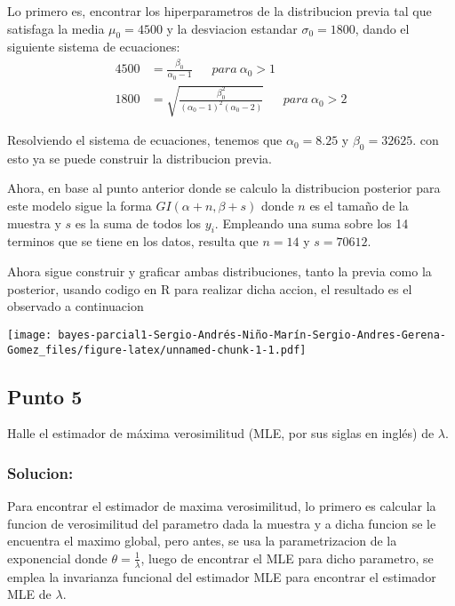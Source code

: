 \documentclass[
]{article}
\begin{document}
Lo primero es, encontrar los hiperparametros de la distribucion previa
tal que satisfaga la media \(\mu_0 = 4500\) y la desviacion estandar
\(\sigma_0 = 1800\), dando el siguiente sistema de ecuaciones: \[
\begin{split}
4500&=\frac{\beta_0}{\alpha_0-1}\ \ \ \ \ \ \ para \ \alpha_0 >1\\
1800&=\sqrt{\frac{\beta_0^2}{(\alpha_0-1)^2(\alpha_0-2)}} \ \ \ \ \ \ \ para \ \alpha_0>2
\end{split}
\]

Resolviendo el sistema de ecuaciones, tenemos que \(\alpha_0=8.25\) y
\(\beta_0=32625\). con esto ya se puede construir la distribucion
previa.

Ahora, en base al punto anterior donde se calculo la distribucion
posterior para este modelo sigue la forma \(GI(\alpha +n, \beta +s)\)
donde \(n\) es el tamaño de la muestra y \(s\) es la suma de todos los
\(y_i\). Empleando una suma sobre los 14 terminos que se tiene en los
datos, resulta que \(n=14\) y \(s=70612\).

Ahora sigue construir y graficar ambas distribuciones, tanto la previa
como la posterior, usando codigo en R para realizar dicha accion, el
resultado es el observado a continuacion

\texttt{[image: bayes-parcial1-Sergio-Andrés-Niño-Marín-Sergio-Andres-Gerena-Gomez\_files/figure-latex/unnamed-chunk-1-1.pdf]}

\hypertarget{punto-5}{%
\subsection*{Punto 5}\label{punto-5}}

Halle el estimador de máxima verosimilitud (MLE, por sus siglas en
inglés) de \(\lambda\).

\hypertarget{solucion-4}{%
\subsubsection*{Solucion:}\label{solucion-4}}

Para encontrar el estimador de maxima verosimilitud, lo primero es
calcular la funcion de verosimilitud del parametro dada la muestra y a
dicha funcion se le encuentra el maximo global, pero antes, se usa la
parametrizacion de la exponencial donde \(\theta=\frac{1}{\lambda}\),
luego de encontrar el MLE para dicho parametro, se emplea la invarianza
funcional del estimador MLE para encontrar el estimador MLE de
\(\lambda\).
\end{document}
